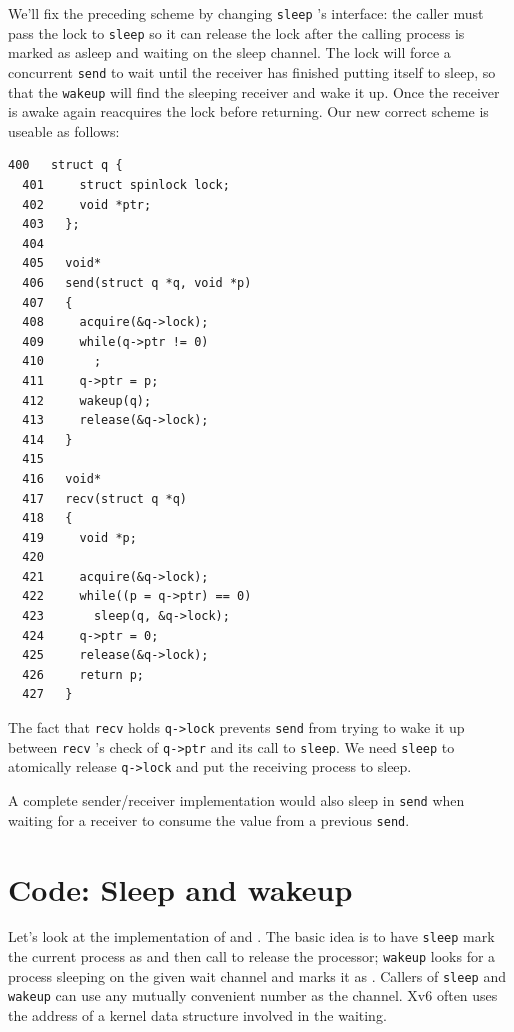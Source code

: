 We'll fix the preceding scheme by changing
\lstinline{sleep} 's
interface:
the caller must pass the lock to
\lstinline{sleep}
so it can release the lock after
the calling process is marked as asleep and waiting on the
sleep channel.
The lock will force a concurrent
\lstinline{send}
to wait until the receiver has finished putting itself to sleep,
so that the
\lstinline{wakeup}
will find the sleeping receiver and wake it up.
Once the receiver is awake again
reacquires the lock before returning.
Our new correct scheme is useable as follows:
\begin{lstlisting}[]
  400	struct q {
  401	  struct spinlock lock;
  402	  void *ptr;
  403	};
  404	
  405	void*
  406	send(struct q *q, void *p)
  407	{
  408	  acquire(&q->lock);
  409	  while(q->ptr != 0)
  410	    ;
  411	  q->ptr = p;
  412	  wakeup(q);
  413	  release(&q->lock);
  414	}
  415	
  416	void*
  417	recv(struct q *q)
  418	{
  419	  void *p;
  420	
  421	  acquire(&q->lock);
  422	  while((p = q->ptr) == 0)
  423	    sleep(q, &q->lock);
  424	  q->ptr = 0;
  425	  release(&q->lock);
  426	  return p;
  427	}
\end{lstlisting}

The fact that
\lstinline{recv}
holds
\lstinline{q->lock}
prevents 
\lstinline{send}
from trying to wake it up between 
\lstinline{recv} 's
check of
\lstinline{q->ptr}
and its call to
\lstinline{sleep}.
We need
\lstinline{sleep}
to atomically release
\lstinline{q->lock}
and put the receiving process to sleep.

A complete sender/receiver implementation would also sleep
in
\lstinline{send}
when waiting for a receiver to consume
the value from a previous
\lstinline{send}.
\section{Code: Sleep and wakeup}

Let's look at the implementation of
and
.
The basic idea is to have
\lstinline{sleep}
mark the current process as
and then call
to release the processor;
\lstinline{wakeup}
looks for a process sleeping on the given wait channel
and marks it as 
.
Callers of
\lstinline{sleep}
and
\lstinline{wakeup}
can use any mutually convenient number as the channel.
Xv6 often uses the address
of a kernel data structure involved in the waiting.

